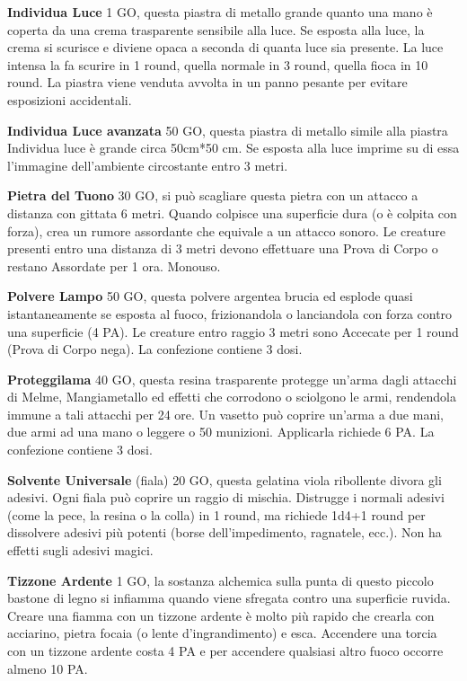 \documentclass[12pt,a4paper,twoside,openany]{book}
\begin{document}
\begin{multicols}{2}
\textbf{Individua Luce} 1 GO, questa piastra di metallo grande quanto una mano è coperta da una crema trasparente sensibile alla luce. Se esposta alla luce, la crema si scurisce e diviene opaca a seconda di quanta luce sia presente. La luce intensa la fa scurire in 1 round, quella normale in 3 round, quella fioca in 10 round.
La piastra viene venduta avvolta in un panno pesante per evitare esposizioni accidentali. 

\textbf{Individua Luce avanzata} 50 GO, questa piastra di metallo simile alla piastra Individua luce è grande circa 50cm*50 cm. Se esposta alla luce imprime su di essa l'immagine dell'ambiente circostante entro 3 metri.

\textbf{Pietra del Tuono} 30 GO, si può scagliare questa pietra con un attacco a distanza con gittata 6 metri. Quando colpisce una superficie dura (o è colpita con forza), crea un rumore assordante che equivale a un attacco sonoro. Le creature presenti entro una distanza di 3 metri devono effettuare una Prova di Corpo o restano Assordate per 1 ora. Monouso.

\textbf{Polvere Lampo} 50 GO, questa polvere argentea brucia ed esplode quasi istantaneamente se esposta al fuoco, frizionandola o lanciandola con forza contro una superficie (4 PA). Le creature entro raggio 3 metri sono Accecate per 1 round (Prova di Corpo nega). La confezione contiene 3 dosi. 

\textbf{Proteggilama} 40 GO, questa resina trasparente protegge un'arma dagli attacchi di Melme, Mangiametallo ed effetti che corrodono o sciolgono le armi, rendendola immune a tali attacchi per 24 ore. Un vasetto può coprire un'arma a due mani, due armi ad una mano o leggere o 50 munizioni. Applicarla richiede 6 PA. La confezione contiene 3 dosi.

\textbf{Solvente Universale} (fiala) 20 GO, questa gelatina viola ribollente divora gli adesivi. Ogni fiala può coprire un raggio di mischia. Distrugge i normali adesivi (come la pece, la resina o la colla) in 1 round, ma richiede 1d4+1 round per dissolvere adesivi più potenti (borse dell'impedimento, ragnatele, ecc.). Non ha effetti sugli adesivi magici.

\textbf{Tizzone Ardente} 1 GO, la sostanza alchemica sulla punta di questo piccolo bastone di legno si infiamma quando viene sfregata contro una superficie ruvida. Creare una fiamma con un tizzone ardente è molto più rapido che crearla con acciarino, pietra focaia (o lente d'ingrandimento) e esca. Accendere una torcia con un tizzone ardente costa 4 PA e per accendere qualsiasi altro fuoco occorre almeno 10 PA.


\end{multicols}
\end{document}
